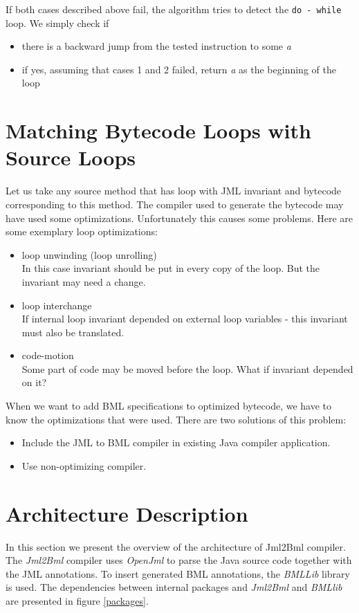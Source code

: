 \documentclass{acm_proc_article-sp}
\begin{document}
If both cases described above fail, the algorithm tries to detect the \texttt{do - while} loop. We simply check if
\begin{itemize}
\item{there is a backward jump from the tested instruction to some \textit{a}}
\item{if yes, assuming that cases 1 and 2 failed, return \textit{a} as the beginning of the loop}
\end{itemize}

\section{Matching Bytecode Loops with Source Loops}
Let us take any source method that has loop with JML invariant and bytecode corresponding to this method. The compiler used to generate the bytecode may have used some optimizations. Unfortunately this causes some problems. Here are some exemplary loop optimizations:
\begin{itemize}
	\item loop unwinding (loop unrolling)\\
In this case invariant should be put in every copy of the loop. But the invariant may need a change.
	\item loop interchange\\
If internal loop invariant depended on external loop variables - this invariant must also be translated.
	\item code-motion\\
Some part of code may be moved before the loop. What if invariant depended on it?
\end{itemize}
When we want to add BML specifications to optimized bytecode, we have to know the optimizations that were used. There are two solutions of this problem:
\begin{itemize}
	\item Include the JML to BML compiler in existing Java compiler application.
	\item Use non-optimizing compiler.
\end{itemize}

\section{Architecture Description}
In this section we present the overview of the architecture of Jml2Bml compiler. The \textit{Jml2Bml} compiler uses \textit{OpenJml} to parse the Java source code together with the JML annotations. To insert generated BML annotations, the \textit{BMLLib} library is used. The dependencies between internal packages and \textit{Jml2Bml} and \textit{BMLlib} are presented in figure \ref{packages}.
\end{document}
